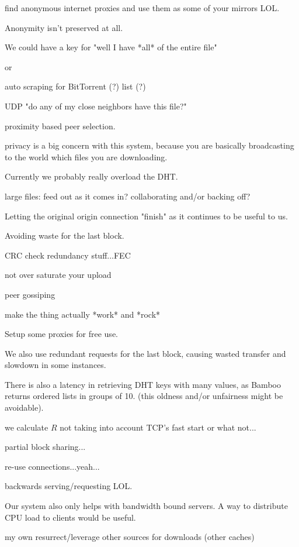 find anonymous internet proxies and use them as some of your mirrors LOL.

Anonymity isn't preserved at all.

We could have a key for "well I have *all* of the entire file"

or 

auto scraping for BitTorrent (?) list (?)

UDP "do any of my close neighbors have this file?"

proximity based peer selection.

privacy is a big concern with this system, because you are basically broadcasting to the world which files you are downloading.

Currently we probably really overload the DHT.

large files: feed out as it comes in?
 collaborating and/or backing off?
 
Letting the original origin connection "finish" as it continues to be useful to us.

Avoiding waste for the last block. 
 
CRC check redundancy stuff...FEC

not over saturate your upload

peer gossiping

make the thing actually *work* and *rock*

Setup some proxies for free use.

We also use redundant requests for the last block, causing wasted transfer and slowdown in some instances.  

There is also a latency in retrieving DHT keys with many values, as Bamboo returns ordered lists in groups of 10.
(this oldness and/or unfairness might be avoidable).

we calculate $R$ not taking into account TCP's fast start or what not...

partial block sharing...

re-use connections...yeah...

backwards serving/requesting LOL.

Our system also only helps with bandwidth bound servers.  A way to distribute CPU load to clients would be useful.


my own resurrect/leverage other sources for downloads (other caches)